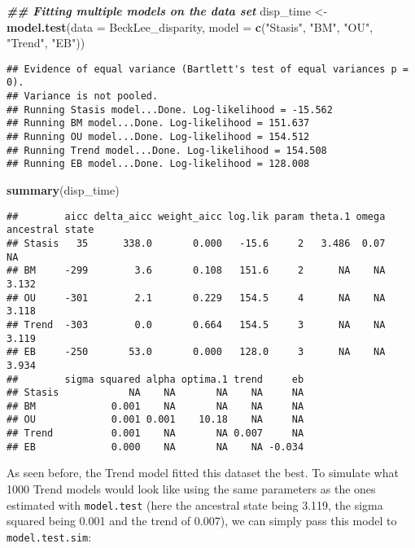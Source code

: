 \documentclass[
]{book}
\newenvironment{Shaded}{\begin{snugshade}}{\end{snugshade}}
\newcommand{\AttributeTok}[1]{\textcolor[rgb]{0.13,0.29,0.53}{#1}}
\newcommand{\DocumentationTok}[1]{\textcolor[rgb]{0.56,0.35,0.01}{\textbf{\textit{#1}}}}
\newcommand{\FunctionTok}[1]{\textcolor[rgb]{0.13,0.29,0.53}{\textbf{#1}}}
\newcommand{\NormalTok}[1]{#1}
\newcommand{\OtherTok}[1]{\textcolor[rgb]{0.56,0.35,0.01}{#1}}
\newcommand{\StringTok}[1]{\textcolor[rgb]{0.31,0.60,0.02}{#1}}
\begin{document}
\begin{Shaded}
\begin{Highlighting}[]
\DocumentationTok{\#\# Fitting multiple models on the data set}
\NormalTok{disp\_time }\OtherTok{\textless{}{-}} \FunctionTok{model.test}\NormalTok{(}\AttributeTok{data =}\NormalTok{ BeckLee\_disparity,}
                    \AttributeTok{model =} \FunctionTok{c}\NormalTok{(}\StringTok{"Stasis"}\NormalTok{, }\StringTok{"BM"}\NormalTok{, }\StringTok{"OU"}\NormalTok{, }\StringTok{"Trend"}\NormalTok{, }\StringTok{"EB"}\NormalTok{))}
\end{Highlighting}
\end{Shaded}

\begin{verbatim}
## Evidence of equal variance (Bartlett's test of equal variances p = 0).
## Variance is not pooled.
## Running Stasis model...Done. Log-likelihood = -15.562
## Running BM model...Done. Log-likelihood = 151.637
## Running OU model...Done. Log-likelihood = 154.512
## Running Trend model...Done. Log-likelihood = 154.508
## Running EB model...Done. Log-likelihood = 128.008
\end{verbatim}

\begin{Shaded}
\begin{Highlighting}[]
\FunctionTok{summary}\NormalTok{(disp\_time)}
\end{Highlighting}
\end{Shaded}

\begin{verbatim}
##        aicc delta_aicc weight_aicc log.lik param theta.1 omega ancestral state
## Stasis   35      338.0       0.000   -15.6     2   3.486  0.07              NA
## BM     -299        3.6       0.108   151.6     2      NA    NA           3.132
## OU     -301        2.1       0.229   154.5     4      NA    NA           3.118
## Trend  -303        0.0       0.664   154.5     3      NA    NA           3.119
## EB     -250       53.0       0.000   128.0     3      NA    NA           3.934
##        sigma squared alpha optima.1 trend     eb
## Stasis            NA    NA       NA    NA     NA
## BM             0.001    NA       NA    NA     NA
## OU             0.001 0.001    10.18    NA     NA
## Trend          0.001    NA       NA 0.007     NA
## EB             0.000    NA       NA    NA -0.034
\end{verbatim}

As seen before, the Trend model fitted this dataset the best.
To simulate what 1000 Trend models would look like using the same parameters as the ones estimated with \texttt{model.test} (here the ancestral state being 3.119, the sigma squared being 0.001 and the trend of 0.007), we can simply pass this model to \texttt{model.test.sim}:
\end{document}

